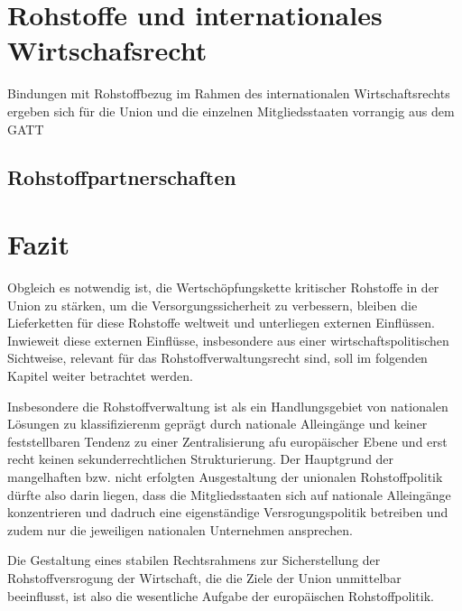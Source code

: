 \documentclass[12pt,a4paper,oneside]{book} %
\begin{document}
	\section{Rohstoffe und internationales Wirtschafsrecht}
	Bindungen mit Rohstoffbezug im Rahmen des internationalen Wirtschaftsrechts ergeben sich für die Union und die einzelnen Mitgliedsstaaten vorrangig aus dem GATT
	
	\subsection{Rohstoffpartnerschaften}
	
	
	\section{Fazit}
	Obgleich es notwendig ist, die Wertschöpfungskette kritischer Rohstoffe in der Union zu stärken, um die Versorgungssicherheit zu verbessern, bleiben die Lieferketten für diese Rohstoffe weltweit und unterliegen externen Einflüssen. Inwieweit diese externen Einflüsse, insbesondere aus einer wirtschaftspolitischen Sichtweise, relevant für das Rohstoffverwaltungsrecht sind, soll im folgenden Kapitel weiter betrachtet werden.
	
	Insbesondere die Rohstoffverwaltung ist als ein Handlungsgebiet von nationalen Lösungen zu klassifizierenm geprägt durch nationale Alleingänge und keiner feststellbaren Tendenz zu einer Zentralisierung afu europäischer Ebene und erst recht keinen sekunderrechtlichen Strukturierung. Der Hauptgrund der mangelhaften bzw. nicht erfolgten Ausgestaltung der unionalen Rohstoffpolitik dürfte also darin liegen, dass die Mitgliedsstaaten sich auf nationale Alleingänge konzentrieren und dadruch eine eigenständige Versrogungspolitik betreiben und zudem nur die jeweiligen nationalen Unternehmen ansprechen.
	
	Die Gestaltung eines stabilen Rechtsrahmens zur Sicherstellung der Rohstoffversrogung der Wirtschaft, die die Ziele der Union unmittelbar beeinflusst, ist also die wesentliche Aufgabe der europäischen Rohstoffpolitik.
	
\end{document}
